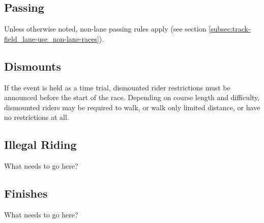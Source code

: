 \subsection{Passing}

Unless otherwise noted, non-lane passing rules apply (see section \ref{subsec:track-field_lane-use_non-lane-races}).

\subsection{Dismounts}

If the event is held as a time trial, dismounted rider restrictions must be announced before the start of the race.
Depending on course length and difficulty, dismounted riders may be required to walk, or walk only limited distance, or have no restrictions at all.

\subsection{Illegal Riding}

\begin{framed}
What needs to go here?
\end{framed}

\subsection{Finishes}

\begin{framed}
What needs to go here?
\end{framed}

